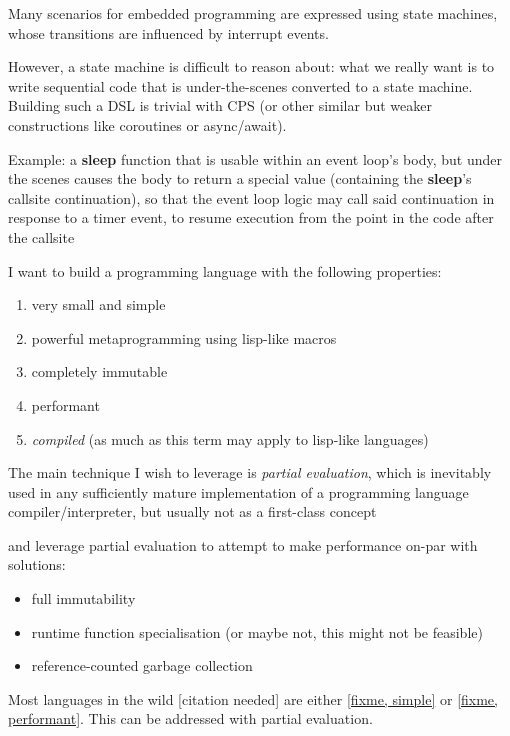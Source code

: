 \documentclass[main.tex]{subfiles}
\begin{document}
Many scenarios for embedded programming are expressed using
state machines, whose transitions are influenced by interrupt events.

However, a state machine is difficult to reason about: what we really
want is to write sequential code that is under-the-scenes converted
to a state machine. Building such a DSL is trivial with CPS (or other
similar but weaker constructions like coroutines or async/await).

Example: a \textbf{sleep} function that is usable within an event loop's body,
but under the scenes causes the body to return a special value (containing the
\textbf{sleep}'s callsite continuation), so that the event loop logic may call
said continuation in response to a timer event, to resume execution from the
point in the code after the callsite

\pagebreak

I want to build a programming language with the following properties:
\begin{enumerate}
    \item very small and simple
    \item powerful metaprogramming using lisp-like macros
    \item completely immutable
    \item performant
    \item \emph{compiled} (as much as this term may apply to lisp-like languages)
\end{enumerate}

The main technique I wish to leverage is \emph{partial evaluation}, which is
inevitably used in any sufficiently mature implementation of a programming
language compiler/interpreter, but usually not as a first-class concept

 and
leverage partial evaluation to attempt to make performance on-par with
 solutions:
\begin{itemize}
    \item full immutability
    \item runtime function specialisation (or maybe not, this might not be feasible)
    \item reference-counted garbage collection
\end{itemize}

Most languages in the wild [citation needed] are either \ref{fixme, simple} or
\ref{fixme, performant}. This can be addressed with partial evaluation.
\end{document}

